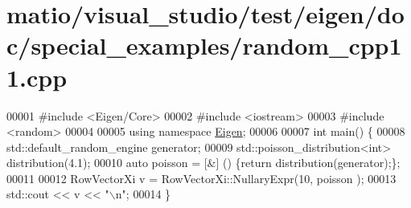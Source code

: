 \hypertarget{matio_2visual__studio_2test_2eigen_2doc_2special__examples_2random__cpp11_8cpp_source}{}\section{matio/visual\+\_\+studio/test/eigen/doc/special\+\_\+examples/random\+\_\+cpp11.cpp}
\label{matio_2visual__studio_2test_2eigen_2doc_2special__examples_2random__cpp11_8cpp_source}

\begin{DoxyCode}
00001 \textcolor{preprocessor}{#include <Eigen/Core>}
00002 \textcolor{preprocessor}{#include <iostream>}
00003 \textcolor{preprocessor}{#include <random>}
00004 
00005 \textcolor{keyword}{using namespace }\hyperlink{namespace_eigen}{Eigen};
00006 
00007 \textcolor{keywordtype}{int} main() \{
00008   std::default\_random\_engine generator;
00009   std::poisson\_distribution<int> distribution(4.1);
00010   \textcolor{keyword}{auto} poisson = [&] () \{\textcolor{keywordflow}{return} distribution(generator);\};
00011 
00012   RowVectorXi v = RowVectorXi::NullaryExpr(10, poisson );
00013   std::cout << v << \textcolor{stringliteral}{"\(\backslash\)n"};
00014 \}
\end{DoxyCode}

